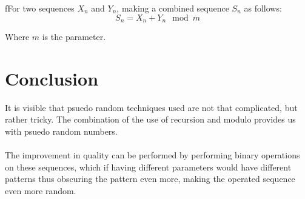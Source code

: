 \begin{definition}
    fFor two sequences $X_n$ and $Y_n$, making a combined 
    sequence $S_n$ as follows:\\
    \begin{equation*}
        S_n = X_{n} + Y_{n} \mod m
    \end{equation*}

    \noindent Where $m$ is the parameter.
\end{definition}

\section{Conclusion}
It is visible that psuedo random techniques used are not 
that complicated, but rather tricky. The combination of 
the use of recursion and modulo provides us with psuedo 
random numbers. 
\\\\
The improvement in quality can be performed 
by performing binary operations on these sequences, which 
if having different parameters would have different patterns 
thus obscuring the pattern even more, making the operated 
sequence even more random.